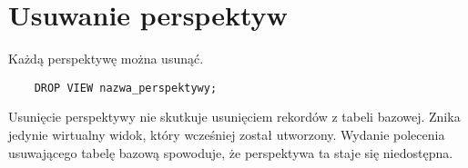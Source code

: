 \documentclass[a4paper]{article}
\begin{document}
\pagebreak

\section{Usuwanie perspektyw}

Każdą perspektywę można usunąć.

\begin{verbatim}
    DROP VIEW nazwa_perspektywy;
\end{verbatim}

Usunięcie perspektywy nie skutkuje usunięciem rekordów z tabeli bazowej. Znika jedynie wirtualny widok, który wcześniej został utworzony. Wydanie polecenia usuwającego tabelę bazową spowoduje, że perspektywa ta staje się niedostępna.
\end{document}

